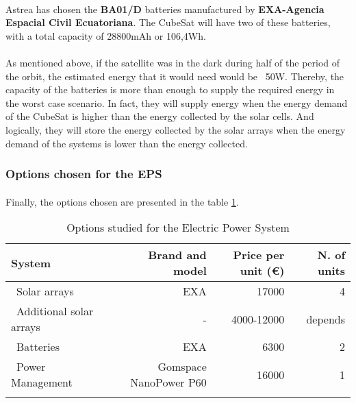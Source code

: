 \paragraph{}Astrea has chosen the \textbf{BA01/D} batteries manufactured by \textbf{EXA-Agencia Espacial Civil Ecuatoriana}. The CubeSat will have two of these batteries, with a total capacity of 28800mAh or 106,4Wh.

\paragraph{}As mentioned above, if the satellite was in the dark during half of the period of the orbit, the estimated energy that it would need would be ~50W. Thereby, the capacity of the batteries is more than enough to supply the required energy in the worst case scenario. In fact, they will supply energy when the energy demand of the CubeSat is higher than the energy collected by the solar cells. And logically, they will store the energy collected by the solar arrays when the energy demand of the systems is lower than the energy collected.

\subsubsection{Options chosen for the EPS}

\paragraph{}Finally, the options chosen are presented in the table \ref{epsfinal}.

\begin{longtable}{| l | r | r | r | }
\hline
\rowcolor[gray]{0.80}	\textbf{System} &  \textbf{Brand and model}     & \textbf{Price per unit (\euro)}  & \textbf{N. of units}  \\
\hline
\endfirsthead

	   ~Solar arrays & EXA & 17000 & 4\\
	   ~Additional solar arrays & - & 4000-12000 & depends\\
	   ~Batteries & EXA & 6300 & 2 \\
	   ~Power Management & Gomspace NanoPower P60 & 16000 & 1 \\
	\hline

\caption{Options studied for the Electric Power System}
\label{epsfinal}
\end{longtable}